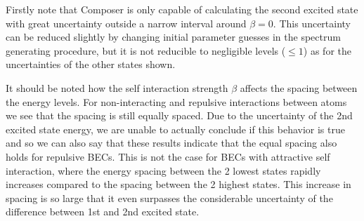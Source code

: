 \documentclass[a4paper, twocolumn]{revtex4-1}
\begin{document}
Firstly note that Composer is only capable of calculating the second excited state with great uncertainty outside a narrow interval around $\beta = 0$. This uncertainty can be reduced slightly by changing initial parameter guesses in the spectrum generating procedure, but it is not reducible to negligible levels ($\leq 1$) as for the uncertainties of the other states shown.

It should be noted how the self interaction strength $\beta$ affects the spacing between the energy levels. For non-interacting and repulsive interactions between atoms we see that the spacing is still equally spaced. Due to the uncertainty of the 2nd excited state energy, we are unable to actually conclude if this behavior is true and so we can also say that these results indicate that the equal spacing also holds for repulsive BECs. This is not the case for BECs with attractive self interaction, where the energy spacing between the 2 lowest states rapidly increases compared to the spacing between the 2 highest states. This increase in spacing is so large that it even surpasses the considerable uncertainty of the difference between 1st and 2nd excited state. \\
\end{document}
